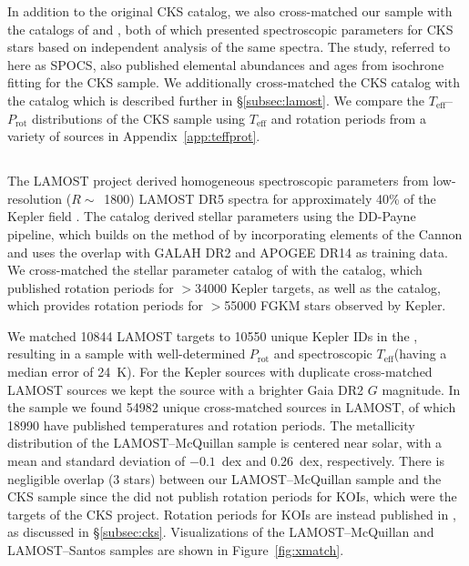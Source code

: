 \documentclass[linenumbers,trackchanges,twocolumn]{aastex631}
\newcommand{\lamostmcq}{LAMOST--McQuillan\xspace}
\newcommand{\lamostsan}{LAMOST--Santos\xspace}
\newcommand{\teff}{\ensuremath{T_{\mathrm{eff}}}\xspace}
\newcommand{\prot}{\ensuremath{P_\mathrm{rot}}\xspace}
\begin{document}
In addition to the original CKS catalog, we also cross-matched our sample with the catalogs of \citet{Brewer2018} and \citet{Martinez2019}, both of which presented spectroscopic parameters for CKS stars based on independent analysis of the same spectra. The \citet{Brewer2018} study, referred to here as SPOCS, also published elemental abundances and ages from isochrone fitting for the CKS sample. We additionally cross-matched the CKS catalog with the  catalog \citep{Xiang2019} which is described further in \S\ref{subsec:lamost}. We compare the \teff--\prot distributions of the CKS sample using \teff and rotation periods from a variety of sources in Appendix~\ref{app:teffprot}.

\subsection{ \label{subsec:lamost}}
The LAMOST project derived homogeneous spectroscopic parameters from low-resolution ($R\sim$~1800) LAMOST DR5 spectra for approximately 40\% of the Kepler field \citep{Zong2018, Xiang2019}.  The \citet{Xiang2019} catalog derived stellar parameters using the DD-Payne pipeline, which builds on the method of \citet{Ting2017b} by incorporating elements of the Cannon \citep{Ness2015} and uses the overlap with GALAH DR2 and APOGEE DR14 as training data. We cross-matched the  stellar parameter catalog of \citet{Xiang2019} with the \citet{McQuillan2014} catalog, which published rotation periods for $>$34000 Kepler targets, as well as the \citet{Santos2021} catalog, which provides rotation periods for $>$55000 FGKM stars observed by Kepler.

We matched 10844 LAMOST targets to 10550 unique Kepler IDs in the \citet{McQuillan2014}, resulting in a sample with well-determined \prot and spectroscopic \teff (having a median error of 24~K). For the Kepler sources with duplicate cross-matched LAMOST sources we kept the source with a brighter Gaia DR2 $G$ magnitude. In the \citet{Santos2021} sample we found 54982 unique cross-matched sources in LAMOST, of which 18990 have published temperatures and rotation periods. The metallicity distribution of the LAMOST--McQuillan sample is centered near solar, with a mean and standard deviation of $-0.1$~dex and 0.26~dex, respectively. There is negligible overlap (3 stars) between our LAMOST--McQuillan sample and the CKS sample since the \citet{McQuillan2014} did not publish rotation periods for KOIs, which were the targets of the CKS project. Rotation periods for KOIs are instead published in \citet{McQuillan2013}, as discussed in \S\ref{subsec:cks}. Visualizations of the \lamostmcq and \lamostsan samples are shown in Figure~\ref{fig:xmatch}.
\end{document}
